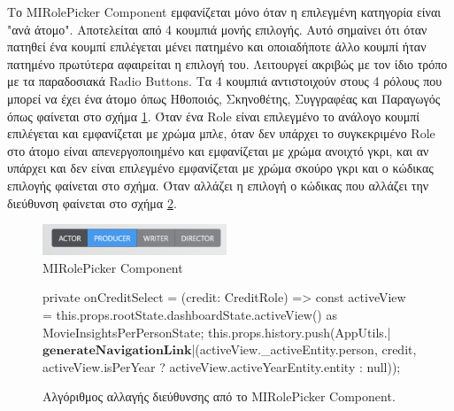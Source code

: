 Το MIRolePicker Component εμφανίζεται μόνο όταν η επιλεγμένη κατηγορία είναι "ανά άτομο". Αποτελείται από 4 κουμπιά μονής επιλογής. Αυτό σημαίνει ότι όταν πατηθεί ένα κουμπί επιλέγεται μένει πατημένο και οποιαδήποτε άλλο κουμπί ήταν πατημένο πρωτύτερα αφαιρείται η επιλογή του. Λειτουργεί ακριβώς με τον ίδιο τρόπο με τα παραδοσιακά Radio Buttons. Τα 4 κουμπιά αντιστοιχούν στους 4 ρόλους που μπορεί να έχει ένα άτομο όπως Ηθοποιός, Σκηνοθέτης, Συγγραφέας και Παραγωγός όπως φαίνεται στο σχήμα \ref{layout:mirolepicker}. Όταν ένα Role είναι επιλεγμένο το ανάλογο κουμπί επιλέγεται και εμφανίζεται με χρώμα μπλε, όταν δεν υπάρχει το συγκεκριμένο Role στο άτομο είναι απενεργοποιημένο και εμφανίζεται με χρώμα ανοιχτό γκρι, και αν υπάρχει και δεν είναι επιλεγμένο εμφανίζεται με χρώμα σκούρο γκρι και ο κώδικας επιλογής φαίνεται στο σχήμα. Όταν αλλάζει η επιλογή ο κώδικας που αλλάζει την διεύθυνση φαίνεται στο σχήμα \ref{code:mirolepicker_urlchanger}.
\begin{figure}[h]
  \centering
  \includegraphics[width=55mm]{Chapters/5 - Architecture/Client/Images/mirolepicker.png}
  \caption{MIRolePicker Component}
  \label{layout:mirolepicker}
\end{figure}

\begin{figure}[H]
    \begin{TypeScriptcode}
private onCreditSelect = (credit: CreditRole) => {
  const activeView = this.props.rootState.dashboardState.activeView() as MovieInsightsPerPersonState;
  this.props.history.push(AppUtils.|$\textbf{generateNavigationLink}$|(activeView._activeEntity.person, credit, activeView.isPerYear ? activeView.activeYearEntity.entity : null));
}
    \end{TypeScriptcode}
    \caption{Αλγόριθμος αλλαγής διεύθυνσης από το MIRolePicker Component.}
   \label{code:mirolepicker_urlchanger}
\end{figure}